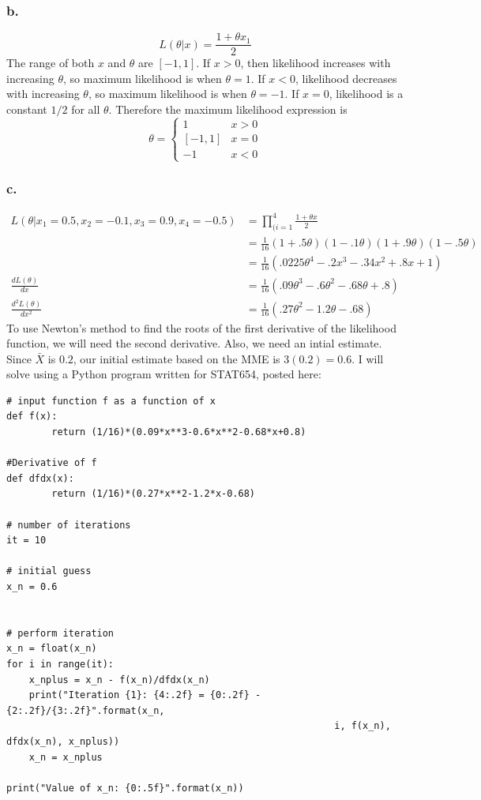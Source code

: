 \documentclass{article}
\begin{document}
\subsubsection*{b.}
\[L(\theta|x) = \frac{1+\theta x_1}{2}\]
The range of both $x$ and $\theta$ are $[-1,1]$. If $x>0$, then likelihood increases with increasing $\theta$, so maximum likelihood is when $\theta =1$. If $x<0$, likelihood decreases with increasing $\theta$, so maximum likelihood is when $\theta = -1$. If $x=0$, likelihood is a constant $1/2$ for all $\theta$. Therefore the maximum likelihood expression is 
\[\theta = \begin{cases}1 & x > 0 \\ [-1,1] & x = 0 \\-1 & x < 0\end{cases}\]
\subsubsection*{c.}
\begin{align*}
L(\theta|x_1=0.5,x_2=-0.1,x_3=0.9,x_4=-0.5) &= \prod_{(i=1}^4 \frac{1+\theta x}{2} \\
&=\frac{1}{16}(1+.5\theta)(1-.1\theta)(1+.9\theta)(1-.5\theta) \\
&=\frac{1}{16}(.0225\theta^4-.2x^3-.34x^2+.8x+1) \\
\frac{dL(\theta)}{dx} &= \frac{1}{16}(.09\theta^3-.6\theta^2-.68\theta+.8) \\
\frac{d^2L(\theta)}{dx^2} &= \frac{1}{16}(.27\theta^2-1.2\theta-.68)
\end{align*}
To use Newton's method to find the roots of the first derivative of the likelihood function, we will need the second derivative. Also, we need an intial estimate. Since $\bar{X}$ is $0.2$, our initial estimate based on the MME is $3(0.2) = 0.6$. I will solve using a Python program written for STAT654, posted here:
\begin{verbatim}
# input function f as a function of x
def f(x):
        return (1/16)*(0.09*x**3-0.6*x**2-0.68*x+0.8)
        
#Derivative of f
def dfdx(x):
        return (1/16)*(0.27*x**2-1.2*x-0.68)
        
# number of iterations
it = 10

# initial guess
x_n = 0.6


# perform iteration
x_n = float(x_n)
for i in range(it):
    x_nplus = x_n - f(x_n)/dfdx(x_n)
    print("Iteration {1}: {4:.2f} = {0:.2f} - {2:.2f}/{3:.2f}".format(x_n,
                                                          i, f(x_n), dfdx(x_n), x_nplus))
    x_n = x_nplus

print("Value of x_n: {0:.5f}".format(x_n))
\end{verbatim}
\end{document}
